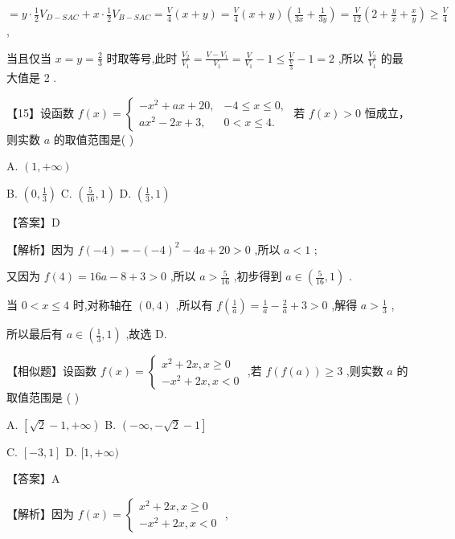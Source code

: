 \documentclass[10pt]{article}
\begin{document}
\(= y \cdot  \frac{1}{2}{V}_{D - {SAC}} + x \cdot  \frac{1}{2}{V}_{B - {SAC}} = \frac{V}{4}\left( {x + y}\right)  = \frac{V}{4}\left( {x + y}\right) \left( {\frac{1}{3x} + \frac{1}{3y}}\right)  = \frac{V}{12}\left( {2 + \frac{y}{x} + \frac{x}{y}}\right)  \geq  \frac{V}{4}\) ,

当且仅当 \(x = y = \frac{2}{3}\) 时取等号,此时 \(\frac{{V}_{2}}{{V}_{1}} = \frac{V - {V}_{1}}{{V}_{1}} = \frac{V}{{V}_{1}} - 1 \leq  \frac{V}{\frac{V}{3}} - 1 = 2\) ,所以 \(\frac{{V}_{2}}{{V}_{1}}\) 的最大值是 2 .

【15】设函数 \(f\left( x\right)  = \left\{  \begin{array}{ll}  - {x}^{2} + {ax} + {20}, &  - 4 \leq  x \leq  0, \\  a{x}^{2} - {2x} + 3, & 0 < x \leq  4. \end{array}\right.\) 若 \(f\left( x\right)  > 0\) 恒成立，则实数 \(a\) 的取值范围是( )

A. \(\left( {1, + \infty }\right)\)

B. \(\left( {0,\frac{1}{3}}\right)\) C. \(\left( {\frac{5}{16},1}\right)\) D. \(\left( {\frac{1}{3},1}\right)\)

【答案】D

【解析】因为 \(f\left( {-4}\right)  =  - {\left( -4\right) }^{2} - {4a} + {20} > 0\) ,所以 \(a < 1\) ;

又因为 \(f\left( 4\right)  = {16a} - 8 + 3 > 0\) ,所以 \(a > \frac{5}{16}\) ,初步得到 \(a \in  \left( {\frac{5}{16},1}\right)\) .

当 \(0 < x \leq  4\) 时,对称轴在 \(\left( {0,4}\right)\) ,所以有 \(f\left( \frac{1}{a}\right)  = \frac{1}{a} - \frac{2}{a} + 3 > 0\) ,解得 \(a > \frac{1}{3}\) ,

所以最后有 \(a \in  \left( {\frac{1}{3},1}\right)\) ,故选 D.

【相似题】设函数 \(f\left( x\right)  = \left\{  \begin{array}{l} {x}^{2} + {2x},x \geq  0 \\   - {x}^{2} + {2x},x < 0 \end{array}\right.\) ,若 \(f\left( {f\left( a\right) }\right)  \geq  3\) ,则实数 \(a\) 的取值范围是 ( )

A. \(\left\lbrack  {\sqrt{2} - 1, + \infty }\right)\) B. \(\left( {-\infty , - \sqrt{2} - 1}\right\rbrack\)

C. \(\left\lbrack  {-3,1}\right\rbrack\) D. \(\lbrack 1, + \infty )\)

【答案】A

【解析】因为 \(f\left( x\right)  = \left\{  \begin{array}{l} {x}^{2} + {2x},x \geq  0 \\   - {x}^{2} + {2x},x < 0 \end{array}\right.\) ,
\end{document}
